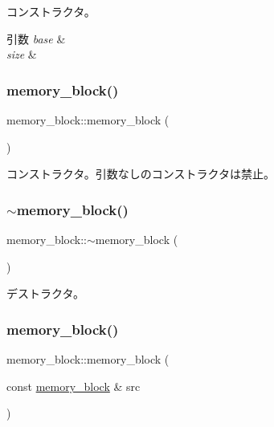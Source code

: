 コンストラクタ。 
\begin{DoxyParams}{引数}
{\em base} & \\
\hline
{\em size} & \\
\hline
\end{DoxyParams}
\hypertarget{classmemory__block_a811ecbeacc0921a0ec8fd0f94a97682d}{}\label{classmemory__block_a811ecbeacc0921a0ec8fd0f94a97682d} 
\subsubsection{\texorpdfstring{memory\+\_\+block()}{memory\_block()}\hspace{0.1cm}{\footnotesize\ttfamily [2/4]}}
{\footnotesize\ttfamily memory\+\_\+block\+::memory\+\_\+block (\begin{DoxyParamCaption}{ }\end{DoxyParamCaption})\hspace{0.3cm}{\ttfamily [delete]}}

コンストラクタ。引数なしのコンストラクタは禁止。 \hypertarget{classmemory__block_a88261ad8b59e2dcae15ba37a0e4f9c88}{}\label{classmemory__block_a88261ad8b59e2dcae15ba37a0e4f9c88} 
\subsubsection{\texorpdfstring{$\sim$memory\+\_\+block()}{~memory\_block()}}
{\footnotesize\ttfamily memory\+\_\+block\+::$\sim$memory\+\_\+block (\begin{DoxyParamCaption}{ }\end{DoxyParamCaption})\hspace{0.3cm}{\ttfamily [virtual]}}

デストラクタ。 \hypertarget{classmemory__block_ab43debaedcdcacb2f269047bb3308d5e}{}\label{classmemory__block_ab43debaedcdcacb2f269047bb3308d5e} 
\subsubsection{\texorpdfstring{memory\+\_\+block()}{memory\_block()}\hspace{0.1cm}{\footnotesize\ttfamily [3/4]}}
{\footnotesize\ttfamily memory\+\_\+block\+::memory\+\_\+block (\begin{DoxyParamCaption}\item[{const \hyperlink{classmemory__block}{memory\+\_\+block} \&}]{src }\end{DoxyParamCaption})\hspace{0.3cm}{\ttfamily [delete]}}

